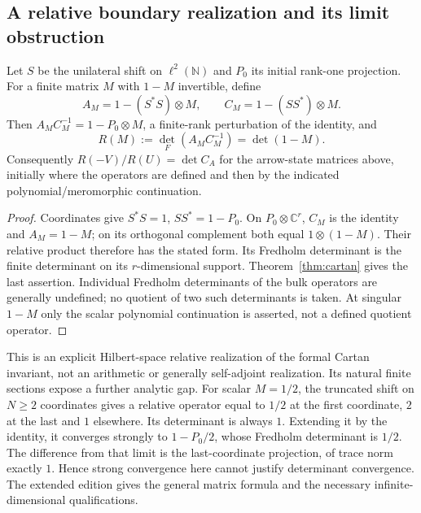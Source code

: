 \subsection{A relative boundary realization and its limit obstruction}
\begin{proposition}\label{prop:boundary}
Let $S$ be the unilateral shift on $\ell^2(\mathbb N)$ and $P_0$ its initial rank-one projection. For a finite matrix $M$ with $1-M$ invertible, define
\[
 A_M=1-(S^*S)\otimes M,\qquad C_M=1-(SS^*)\otimes M.
\]
Then $A_MC_M^{-1}=1-P_0\otimes M$, a finite-rank perturbation of the identity, and
\[
 R(M):=\det_F(A_MC_M^{-1})=\det(1-M).
\]
Consequently $R(-V)/R(U)=\det C_A$ for the arrow-state matrices above, initially where the operators are defined and then by the indicated polynomial/meromorphic continuation.
\end{proposition}
\begin{proof}
Coordinates give $S^*S=1$, $SS^*=1-P_0$. On $P_0\otimes\mathbb C^r$, $C_M$ is the identity and $A_M=1-M$; on its orthogonal complement both equal $1\otimes(1-M)$. Their relative product therefore has the stated form. Its Fredholm determinant is the finite determinant on its $r$-dimensional support. Theorem~\ref{thm:cartan} gives the last assertion. Individual Fredholm determinants of the bulk operators are generally undefined; no quotient of two such determinants is taken. At singular $1-M$ only the scalar polynomial continuation is asserted, not a defined quotient operator.
\end{proof}
This is an explicit Hilbert-space relative realization of the formal Cartan invariant, not an arithmetic or generally self-adjoint realization. Its natural finite sections expose a further analytic gap. For scalar $M=1/2$, the truncated shift on $N\ge2$ coordinates gives a relative operator equal to $1/2$ at the first coordinate, $2$ at the last and $1$ elsewhere. Its determinant is always $1$. Extending it by the identity, it converges strongly to $1-P_0/2$, whose Fredholm determinant is $1/2$. The difference from that limit is the last-coordinate projection, of trace norm exactly $1$. Hence strong convergence here cannot justify determinant convergence. The extended edition gives the general matrix formula and the necessary infinite-dimensional qualifications.

